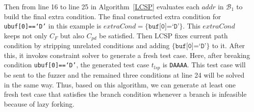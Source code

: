 Then from line 16 to line 25 in Algorithm~\ref{LCSP} evaluates each $addr$ in $\mathcal{B}_1$ to build the final extra condition. The final constructed extra
condition for \texttt{ubuf[0]==`D'} in this example is $extraCond=\{\texttt{buf[0]=`D'}\}$.
This $extraCond$ keeps not only $C_F$ but also $C_{pd}$ be satisfied.
Then LCSP fixes current path condition by stripping unrelated conditions and adding
$\{\texttt{buf[0]=`D'}\}$ to it. After this, it invokes constraint solver to 
generate a fresh test case. Here, after breaking condition \texttt{ubuf[0]==`D'}, the 
generated test case $t_{lsp}$ is \texttt{DAAAA}. This test case will be sent to the fuzzer and the
remained three conditions at line 24 will be solved in the same way. Thus, based on this algorithm, we can generate at least one fresh test case 
that satisfies the branch condition whenever a branch is infeasible 
because of lazy forking. 

